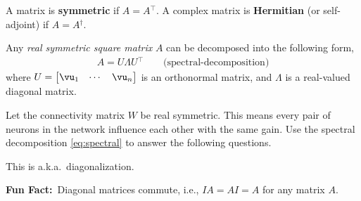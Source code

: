 \documentclass[a4paper,11pt]{exam}
\newcounter{ct}
\newcommand{\trp}{{^\top}} %
\newcommand{\ctrp}{{^\dagger}} %
\newcommand{\funfact}{\textbf{Fun Fact:}~}
\begin{document}
\begin{questions}
A matrix is \textbf{symmetric} if $A = A\trp$. A complex matrix is \textbf{Hermitian} (or self-adjoint) if $A = A\ctrp$.

\begin{tcolorbox}[colback=black!1!,title=Spectral theorem of linear algebra]
Any \textit{real symmetric square matrix} $A$ can be decomposed into the following form,
\begin{align}\label{eq:spectral}
    A = U \Lambda U\trp \qquad \text{(spectral-decomposition)}
\end{align}
where $U = \begin{bmatrix}\vu_1 & \cdots & \vu_n \end{bmatrix}$
is an orthonormal matrix, and $\Lambda$ is a real-valued diagonal matrix.
\end{tcolorbox}

\question Let the connectivity matrix $W$ be real symmetric. This means every pair of neurons in the network influence each other with the same gain.
Use the spectral decomposition \eqref{eq:spectral} to answer the following questions.

This is a.k.a.~diagonalization.

\clearpage

\begin{tcolorbox}
\funfact Diagonal matrices commute, i.e., $IA = AI = A$ for any matrix $A$.
\end{tcolorbox}



\end{questions}
\end{document}
